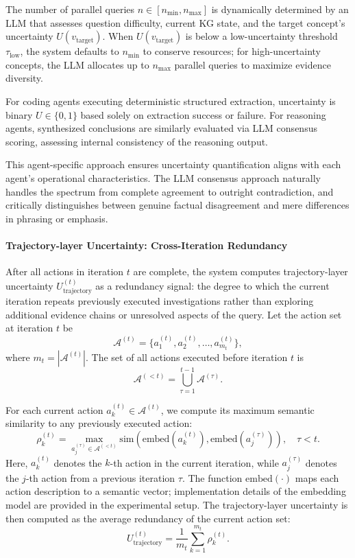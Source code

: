 \documentclass{article}
\begin{document}
The number of parallel queries $n \in [n_{\min}, n_{\max}]$ is dynamically determined by an LLM that assesses question difficulty, current KG state, and the target concept's uncertainty $U(v_{\text{target}})$. When $U(v_{\text{target}})$ is below a low-uncertainty threshold $\tau_{\text{low}}$, the system defaults to $n_{\min}$ to conserve resources; for high-uncertainty concepts, the LLM allocates up to $n_{\max}$ parallel queries to maximize evidence diversity.

For coding agents executing deterministic structured extraction, uncertainty is binary $U \in \{0,1\}$ based solely on extraction success or failure. For reasoning agents, synthesized conclusions are similarly evaluated via LLM consensus scoring, assessing internal consistency of the reasoning output.

This agent-specific approach ensures uncertainty quantification aligns with each agent's operational characteristics. The LLM consensus approach naturally handles the spectrum from complete agreement to outright contradiction, and critically distinguishes between genuine factual disagreement and mere differences in phrasing or emphasis.

\paragraph{Trajectory-layer Uncertainty: Cross-Iteration Redundancy}
After all actions in iteration $t$ are complete, the system computes trajectory-layer uncertainty $U_{\text{trajectory}}^{(t)}$ as a redundancy signal: the degree to which the current iteration repeats previously executed investigations rather than exploring additional evidence chains or unresolved aspects of the query. Let the action set at iteration $t$ be
\[
\mathcal{A}^{(t)}=\{a_1^{(t)}, a_2^{(t)}, \dots, a_{m_t}^{(t)}\},
\]
where $m_t=|\mathcal{A}^{(t)}|$. The set of all actions executed before iteration $t$ is
\[
\mathcal{A}^{(<t)}=\bigcup_{\tau=1}^{t-1}\mathcal{A}^{(\tau)}.
\]

For each current action $a_k^{(t)} \in \mathcal{A}^{(t)}$, we compute its maximum semantic similarity to any previously executed action:
\begin{equation}
\rho_k^{(t)}
=
\max_{a_j^{(\tau)} \in \mathcal{A}^{(<t)}}
\text{sim}\left(
\text{embed}(a_k^{(t)}),
\text{embed}(a_j^{(\tau)})
\right),
\quad \tau < t .
\end{equation}
Here, $a_k^{(t)}$ denotes the $k$-th action in the current iteration, while $a_j^{(\tau)}$ denotes the $j$-th action from a previous iteration $\tau$. The function $\text{embed}(\cdot)$ maps each action description to a semantic vector; implementation details of the embedding model are provided in the experimental setup.
The trajectory-layer uncertainty is then computed as the average redundancy of the current action set:
\begin{equation}
U_{\text{trajectory}}^{(t)}
=
\frac{1}{m_t}
\sum_{k=1}^{m_t}
\rho_k^{(t)} .
\end{equation}
\end{document}
